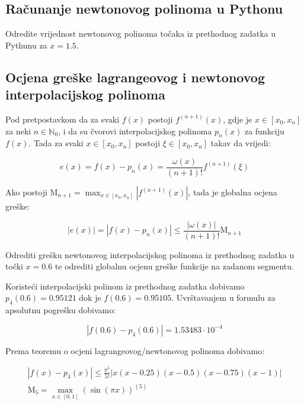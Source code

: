 \newpage

\subsection{Računanje newtonovog polinoma u Pythonu}

\begin{example}
    Odredite vrijednost newtonovog polinoma točaka iz prethodnog zadatka u
    Pythunu za $x=1.5$.
\end{example}



\subsection{Ocjena greške lagrangeovog i newtonovog interpolacijskog polinoma}

Pod pretpostavkom da za svaki $f(x)$ postoji $f^{(n+1)}(x)$, gdje je $x \in [x_0,x_n]$ za neki $n\in\mathbb{N}_0$, i da su čvorovi interpolacijskog polinoma $p_n(x)$ za funkciju $f(x)$. Tada za svaki $x\in[x_0,x_n]$ postoji $\xi\in[x_0,x_n]$ takav da vrijedi:

$$
e(x) = f(x) - p_n(x) = \frac{\omega(x)}{(n + 1)!}f^{(n+1)}(\xi)
$$

Ako postoji $\mathrm{M}_{n+1} = \max_{x\in[x_0,x_n]}\left|f^{(n+1)}(x)\right|$, tada je globalna ocjena greške:

$$
|e(x)| = |f(x) - p_n(x)| \leq \frac{|\omega(x)|}{(n+1)!}\mathrm{M}_{n+1}
$$

\begin{example}
    Odrediti grešku newtonovog interpolacijskog polinoma iz prethodnog zadatka u točki $x=0.6$ te odrediti globalnu ocjenu greške funkcije na zadanom segmentu.
\end{example}

Koristeći interpolacijski polinom iz prethodnog zadatka dobivamo $p_4(0.6) = 0.95121$ dok je $f(0.6) = 0.95105$. Uvrštavanjem u formulu za apsolutnu pogrešku dobivamo:

$$
|f(0.6)-p_4(0.6)| = 1.53483\cdot10^{-4}
$$

Prema teoremu o ocjeni lagrangeovog/newtonovog polinoma dobivamo:

\begin{gather}
|f(x)-p_4(x)| \leq \frac{\pi^5}{5!}|x(x-0.25)(x-0.5)(x-0.75)(x-1)|\\
\mathrm{M}_5=\max_{x\in[0,1]}(\sin(\pi x))^{(5)}
\end{gather}

